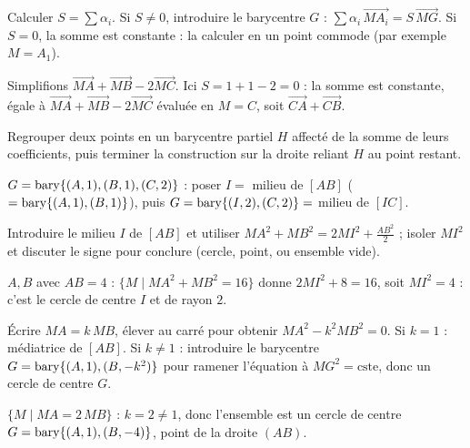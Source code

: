 Calculer $S=\sum\alpha_i$. Si $S\neq0$, introduire le barycentre $G$ :
$\sum\alpha_i\,\vec{MA_i}=S\,\vec{MG}$. Si $S=0$, la somme est constante : la calculer
en un point commode (par exemple $M=A_1$).
\begin{exemple}
Simplifions $\vec{MA}+\vec{MB}-2\vec{MC}$. Ici $S=1+1-2=0$ : la somme est constante,
égale à $\vec{MA}+\vec{MB}-2\vec{MC}$ évaluée en $M=C$, soit $\vec{CA}+\vec{CB}$.
\end{exemple}

Regrouper deux points en un barycentre partiel $H$ affecté de la somme de leurs
coefficients, puis terminer la construction sur la droite reliant $H$ au point restant.
\begin{exemple}
$G=\operatorname{bary}\{(A,1),(B,1),(C,2)\}$ : poser $I=$ milieu de $[AB]$ ($=\operatorname{bary}\{(A,1),(B,1)\}$),
puis $G=\operatorname{bary}\{(I,2),(C,2)\}=$ milieu de $[IC]$.
\end{exemple}

Introduire le milieu $I$ de $[AB]$ et utiliser $MA^2+MB^2=2MI^2+\tfrac{AB^2}{2}$ ;
isoler $MI^2$ et discuter le signe pour conclure (cercle, point, ou ensemble vide).
\begin{exemple}
$A,B$ avec $AB=4$ : $\{M\mid MA^2+MB^2=16\}$ donne $2MI^2+8=16$, soit $MI^2=4$ : c'est
le cercle de centre $I$ et de rayon $2$.
\end{exemple}

Écrire $MA=k\,MB$, élever au carré pour obtenir $MA^2-k^2MB^2=0$. Si $k=1$ : médiatrice
de $[AB]$. Si $k\neq1$ : introduire le barycentre $G=\operatorname{bary}\{(A,1),(B,-k^2)\}$ pour
ramener l'équation à $MG^2=\text{cste}$, donc un cercle de centre $G$.
\begin{exemple}
$\{M\mid MA=2\,MB\}$ : $k=2\neq1$, donc l'ensemble est un cercle de centre
$G=\operatorname{bary}\{(A,1),(B,-4)\}$, point de la droite $(AB)$.
\end{exemple}
